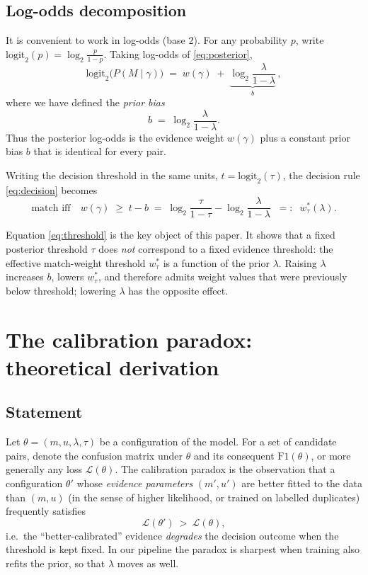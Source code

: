 \documentclass[11pt]{article}
\begin{document}
\subsection{Log-odds decomposition}
It is convenient to work in log-odds (base 2). For any probability $p$, write
$\mathrm{logit}_2(p)=\log_2\frac{p}{1-p}$. Taking log-odds of \eqref{eq:posterior},
\begin{equation}
\mathrm{logit}_2\bigl(P(M\mid\gamma)\bigr)
\;=\;w(\gamma)\;+\;\underbrace{\log_2\frac{\lambda}{1-\lambda}}_{b}\,,
\label{eq:logodds}
\end{equation}
where we have defined the \emph{prior bias}
\begin{equation}
b\;=\;\log_2\frac{\lambda}{1-\lambda}.
\end{equation}
Thus the posterior log-odds is the evidence weight $w(\gamma)$ plus a constant prior bias
$b$ that is identical for every pair.

Writing the decision threshold in the same units, $t=\mathrm{logit}_2(\tau)$, the decision
rule \eqref{eq:decision} becomes
\begin{equation}
\text{match iff}\quad w(\gamma)\;\ge\;t-b\;=\;\log_2\frac{\tau}{1-\tau}
-\log_2\frac{\lambda}{1-\lambda}\;\;=:\;\;w_\tau^*(\lambda).
\label{eq:threshold}
\end{equation}

Equation \eqref{eq:threshold} is the key object of this paper. It shows that a fixed
posterior threshold $\tau$ does \emph{not} correspond to a fixed evidence threshold: the
effective match-weight threshold $w_\tau^*$ is a function of the prior $\lambda$. Raising
$\lambda$ increases $b$, lowers $w_\tau^*$, and therefore admits weight values that were
previously below threshold; lowering $\lambda$ has the opposite effect.

\section{The calibration paradox: theoretical derivation}
\label{sec:paradox}

\subsection{Statement}
Let $\theta=(m,u,\lambda,\tau)$ be a configuration of the model. For a set of candidate
pairs, denote the confusion matrix under $\theta$ and its consequent
$\mathrm{F1}(\theta)$, or more generally any loss $\mathcal{L}(\theta)$. The calibration
paradox is the observation that a configuration $\theta'$ whose \emph{evidence parameters}
$(m',u')$ are better fitted to the data than $(m,u)$ (in the sense of higher likelihood, or
trained on labelled duplicates) frequently satisfies
\begin{equation}
\mathcal{L}(\theta')\ >\ \mathcal{L}(\theta),
\end{equation}
i.e.\ the ``better-calibrated'' evidence \emph{degrades} the decision outcome when the
threshold is kept fixed. In our pipeline the paradox is sharpest when training also
refits the prior, so that $\lambda$ moves as well.
\end{document}
